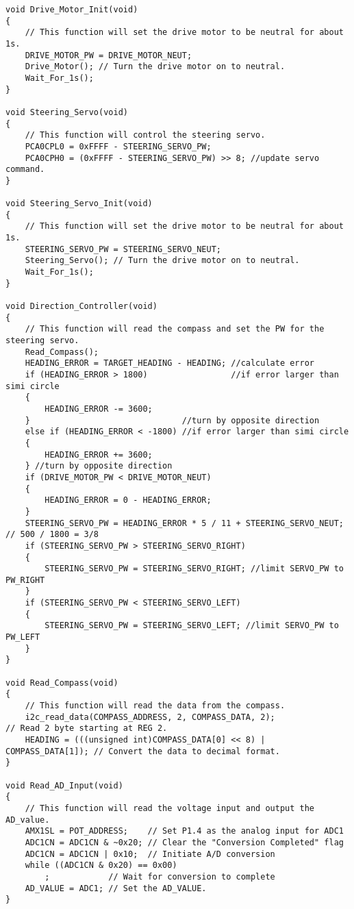\documentclass[12pt]{article}
\begin{document}
\begin{lstlisting}
void Drive_Motor_Init(void)
{
    // This function will set the drive motor to be neutral for about 1s.
    DRIVE_MOTOR_PW = DRIVE_MOTOR_NEUT;
    Drive_Motor(); // Turn the drive motor on to neutral.
    Wait_For_1s();
}

void Steering_Servo(void)
{
    // This function will control the steering servo.
    PCA0CPL0 = 0xFFFF - STEERING_SERVO_PW;
    PCA0CPH0 = (0xFFFF - STEERING_SERVO_PW) >> 8; //update servo command.
}

void Steering_Servo_Init(void)
{
    // This function will set the drive motor to be neutral for about 1s.
    STEERING_SERVO_PW = STEERING_SERVO_NEUT;
    Steering_Servo(); // Turn the drive motor on to neutral.
    Wait_For_1s();
}

void Direction_Controller(void)
{
    // This function will read the compass and set the PW for the steering servo.
    Read_Compass();
    HEADING_ERROR = TARGET_HEADING - HEADING; //calculate error
    if (HEADING_ERROR > 1800)                 //if error larger than simi circle
    {
        HEADING_ERROR -= 3600;
    }                               //turn by opposite direction
    else if (HEADING_ERROR < -1800) //if error larger than simi circle
    {
        HEADING_ERROR += 3600;
    } //turn by opposite direction
    if (DRIVE_MOTOR_PW < DRIVE_MOTOR_NEUT)
    {
        HEADING_ERROR = 0 - HEADING_ERROR;
    }
    STEERING_SERVO_PW = HEADING_ERROR * 5 / 11 + STEERING_SERVO_NEUT; // 500 / 1800 = 3/8
    if (STEERING_SERVO_PW > STEERING_SERVO_RIGHT)
    {
        STEERING_SERVO_PW = STEERING_SERVO_RIGHT; //limit SERVO_PW to PW_RIGHT
    }
    if (STEERING_SERVO_PW < STEERING_SERVO_LEFT)
    {
        STEERING_SERVO_PW = STEERING_SERVO_LEFT; //limit SERVO_PW to PW_LEFT
    }
}

void Read_Compass(void)
{
    // This function will read the data from the compass.
    i2c_read_data(COMPASS_ADDRESS, 2, COMPASS_DATA, 2);                 // Read 2 byte starting at REG 2.
    HEADING = (((unsigned int)COMPASS_DATA[0] << 8) | COMPASS_DATA[1]); // Convert the data to decimal format.
}

void Read_AD_Input(void)
{
    // This function will read the voltage input and output the AD_value.
    AMX1SL = POT_ADDRESS;    // Set P1.4 as the analog input for ADC1
    ADC1CN = ADC1CN & ~0x20; // Clear the "Conversion Completed" flag
    ADC1CN = ADC1CN | 0x10;  // Initiate A/D conversion
    while ((ADC1CN & 0x20) == 0x00)
        ;            // Wait for conversion to complete
    AD_VALUE = ADC1; // Set the AD_VALUE.
}


\end{lstlisting}
\end{document}
